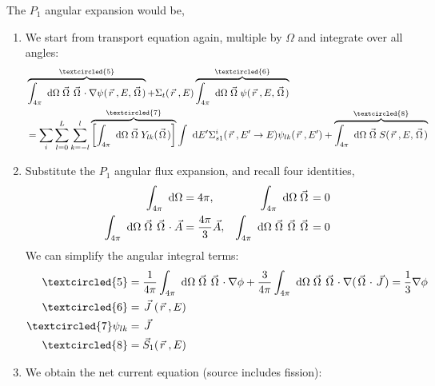 \documentclass{school-22.211-notes}
\begin{document}
The $P_1$ angular expansion would be, 

\begin{enumerate}
\item We start from transport equation again, multiple by $\Omega$ and integrate over all angles: 
\begin{align}
& \overbrace{\int_{4\pi} \dOmega \vecOmega \vecOmega \cdot \gradient \psi(\vecr, E, \vecOmega)}^{\textcircled{5}} 
+ \Sigma_t (\vecr, E) \overbrace{\int_{4\pi} \dOmega \vecOmega \psi(\vecr, E, \vecOmega)}^{\textcircled{6}} \\
&= \Sum_i \Sum_{l=0}^L \Sum_{k=-l}^l \overbrace{\left[\int_{4\pi} \dOmega \vecOmega Y_{lk} (\vecOmega) \right]}^{\textcircled{7}} \int \dE' \Sigma_{s1}^i (\vecr, E'\to E) \psi_{lk}(\vecr, E') 
+ \overbrace{\int_{4\pi} \dOmega \vecOmega S(\vecr, E, \vecOmega)}^{\textcircled{8}} 
\end{align}

\item Substitute the $P_1$ angular flux expansion, 
and recall four identities,
\begin{align}
\int_{4\pi} \mbox{ }\mathrm{d} \Omega &= 4 \pi, & \int_{4\pi} \mbox{ }\mathrm{d} \Omega \left.\vec{\Omega}\right. &= 0 \\
\int_{4\pi} \mbox{ }\mathrm{d} \Omega \left.\vec{\Omega}\right. \left.\vec{\Omega}\right. \cdot \vec{A} &= \frac{4\pi}{3} \vec{A}, & \int_{4\pi} \mbox{ }\mathrm{d} \Omega \left.\vec{\Omega}\right. \left.\vec{\Omega}\right. \left.\vec{\Omega}\right. &= 0 
\end{align}
We can simplify the angular integral terms:
\begin{align}
\textcircled{5} &= \frac{1}{4\pi} \int_{4\pi} \dOmega \vecOmega \vecOmega \cdot \gradient \phi + \frac{3}{4\pi} \int_{4\pi} \dOmega \vecOmega \vecOmega \cdot \gradient (\vecOmega \cdot \vecJ) = \frac{1}{3} \gradient \phi \\
\textcircled{6} &= \vecJ (\vecr, E) \\
\textcircled{7} \psi_{lk} &= \vecJ \\
\textcircled{8} &= \vec{S}_1 (\vecr, E) 
\end{align}







\item We obtain the net current equation (source includes fission):
\end{enumerate}
\end{document}
